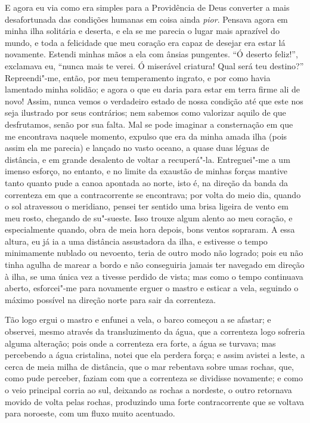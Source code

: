 E agora eu via como era simples para a Providência de Deus converter a
mais desafortunada das condições humanas em coisa ainda \emph{pior}.
Pensava agora em minha ilha solitária e deserta, e ela se me parecia o
lugar mais aprazível do mundo, e toda a felicidade que meu coração era
capaz de desejar era estar lá novamente. Estendi minhas mãos a ela com
ânsias pungentes. ``Ó deserto feliz!'', exclamava eu, ``nunca mais te
verei. Ó miserável criatura! Qual será teu destino?'' Repreendi"-me,
então, por meu temperamento ingrato, e por como havia lamentado minha
solidão; e agora o que eu daria para estar em terra firme ali de novo!
Assim, nunca vemos o verdadeiro estado de nossa condição até que este
nos seja ilustrado por seus contrários; nem sabemos como valorizar
aquilo de que desfrutamos, senão por sua falta. Mal se pode imaginar a
consternação em que me encontrava naquele momento, expulso que era da
minha amada ilha (pois assim ela me parecia) e lançado no vasto oceano,
a quase duas léguas de distância, e em grande desalento de voltar a
recuperá"-la. Entreguei"-me a um imenso esforço, no entanto, e no limite
da exaustão de minhas forças mantive tanto quanto pude a canoa apontada
ao norte, isto é, na direção da banda da correnteza em que a
contracorrente se encontrava; por volta do meio dia, quando o sol
atravessou o meridiano, pensei ter sentido uma brisa ligeira de vento em
meu rosto, chegando de su"-sueste. Isso trouxe algum alento ao meu
coração, e especialmente quando, obra de meia hora depois, bons ventos
sopraram. A essa altura, eu já ia a uma distância assustadora da ilha, e
estivesse o tempo minimamente nublado ou nevoento, teria de outro modo
não logrado; pois eu não tinha agulha de marear a bordo e não
conseguiria jamais ter navegado em direção à ilha, se uma única vez a
tivesse perdido de vista; mas como o tempo continuava aberto,
esforcei"-me para novamente erguer o mastro e esticar a vela, seguindo o
máximo possível na direção norte para sair da correnteza.

Tão logo ergui o mastro e enfunei a vela, o barco começou a se afastar;
e observei, mesmo através da transluzimento da água, que a correnteza
logo sofreria alguma alteração; pois onde a correnteza era forte, a água
se turvava; mas percebendo a água cristalina, notei que ela perdera
força; e assim avistei a leste, a cerca de meia milha de distância, que
o mar rebentava sobre umas rochas, que, como pude perceber, faziam com
que a correnteza se dividisse novamente; e como o veio principal corria
ao sul, deixando as rochas a nordeste, o outro retornava movido de volta
pelas rochas, produzindo uma forte contracorrente que se voltava para
noroeste, com um fluxo muito acentuado.

